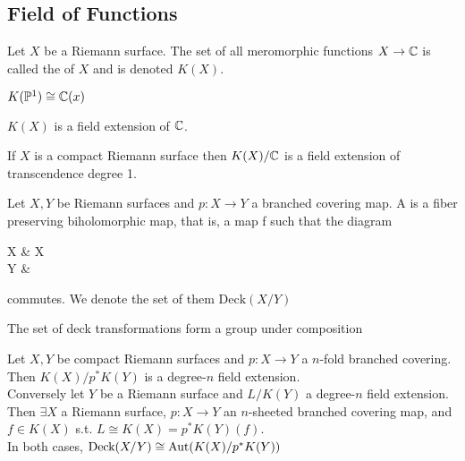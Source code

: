 \documentclass{article}
\begin{document}
\subsection{Field of Functions}

\begin{definition}
	Let $X$ be a Riemann surface. The set of all meromorphic functions $X \to \mathbb{C}$ is called the  of $X$ and is denoted $K(X)$. 
\end{definition}

\begin{example}
	$K(\mathbb{P}^1) \cong \mathbb{C}(x)$
\end{example}

\begin{prop}
	$K(X)$ is a field extension of $\mathbb{C}$. 
\end{prop}

\begin{prop}
	If $X$ is a compact Riemann surface then $K(X)/\mathbb{C}$ is a field extension of transcendence degree 1.  
\end{prop}

\begin{definition}
	Let $X, Y$ be Riemann surfaces and $p : X \to Y$ a branched covering map. A  is a fiber preserving biholomorphic map, that is, a map f such that the diagram
	\begin{tkz}
		X \arrow[r,"f"] \arrow[d,"p"'] & X \arrow[dl,"p"]\\
		Y &
	\end{tkz}
	commutes. We denote the set of them  $\text{Deck}(X/Y)$
\end{definition}

\begin{prop}
	The set of deck transformations form a group under composition
\end{prop}

\begin{theorem}
	Let $X,Y$ be compact Riemann surfaces and $p:X \to Y$ a $n$-fold branched covering. Then $K(X)/p^\ast K(Y)$ is a degree-$n$ field extension. \\
	Conversely let $Y$ be a Riemann surface and $L/K(Y)$ a degree-$n$ field extension. Then $\exists X$ a Riemann surface, $p:X \to Y$ an $n$-sheeted branched covering map, and $f \in K(X)$ s.t. $L\cong K(X)=p^\ast K(Y)(f)$. \\
	In both cases, $\text{Deck}(X/Y) \cong \operatorname{Aut}(K(X) / p^\ast K(Y))$  
\end{theorem}
\end{document}
